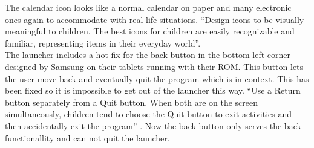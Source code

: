 The calendar icon looks like a normal calendar on paper and many electronic ones again to accommodate with real life situations. 
``Design icons to be visually meaningful to children. 
The best icons for children are easily recognizable and familiar, representing items in their everyday world''\citep{microsoft:usability}.  \\
The launcher includes a hot fix for the back button in the bottom left corner designed by Samsung on their tablets running with their ROM. 
This button lets the user move back and eventually quit the program which is in context. 
This has been fixed so it is impossible to get out of the launcher this way.
``Use a Return button separately from a Quit button. When both are on the screen simultaneously, children tend to choose the Quit button to exit activities and then accidentally exit the program'' \citep{microsoft:usability}. 
Now the back button only serves the back functionallity and can not quit the launcher.

